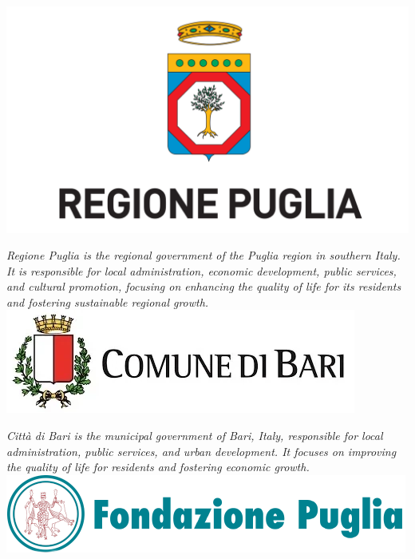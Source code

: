 \documentclass[
	openany, %
	parskip=full, %
	12pt, %
	a4paper, %
]{conferencebooklet} %
\begin{document}
\begin{multicols*}{2}
   \hfill\includegraphics[width=\sponsorscaling\linewidth]{logos/RegionePuglia.png}\hspace*{\fill}

   \textit{Regione Puglia is the regional government of the Puglia region in southern Italy. It is responsible for local administration, economic development, public services, and cultural promotion, focusing on enhancing the quality of life for its residents and fostering sustainable regional growth.} \\

   \hfill\includegraphics[width=\sponsorscaling\linewidth]{logos/bari.png}\hspace*{\fill}

    \textit{Città di Bari is the municipal government of Bari, Italy, responsible for local administration, public services, and urban development. It focuses on improving the quality of life for residents and fostering economic growth.} \\
    
    \hfill\includegraphics[width=\sponsorscaling\linewidth]{logos/puglia.png}\hspace*{\fill}


\end{multicols*}
\end{document}
